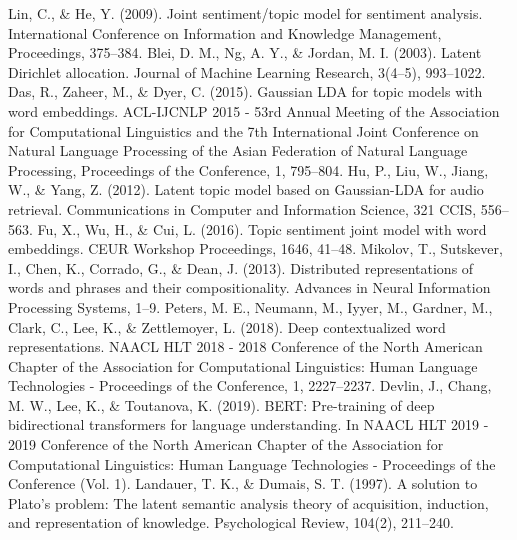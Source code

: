\documentclass[uplatex]{jsarticle}
\begin{document}
\begin{thebibliography}{数字}
     Lin, C., \& He, Y. (2009). Joint sentiment/topic model for sentiment analysis. International Conference on Information and Knowledge Management, Proceedings, 375–384.
     Blei, D. M., Ng, A. Y., \& Jordan, M. I. (2003). Latent Dirichlet allocation. Journal of Machine Learning Research, 3(4–5), 993–1022.
     Das, R., Zaheer, M., \& Dyer, C. (2015). Gaussian LDA for topic models with word embeddings. ACL-IJCNLP 2015 - 53rd Annual Meeting of the Association for Computational Linguistics and the 7th International Joint Conference on Natural Language Processing of the Asian Federation of Natural Language Processing, Proceedings of the Conference, 1, 795–804.
     Hu, P., Liu, W., Jiang, W., \& Yang, Z. (2012). Latent topic model based on Gaussian-LDA for audio retrieval. Communications in Computer and Information Science, 321 CCIS, 556–563.
     Fu, X., Wu, H., \& Cui, L. (2016). Topic sentiment joint model with word embeddings. CEUR Workshop Proceedings, 1646, 41–48.
     Mikolov, T., Sutskever, I., Chen, K., Corrado, G., \& Dean, J. (2013). Distributed representations of words and phrases and their compositionality. Advances in Neural Information Processing Systems, 1–9.
     Peters, M. E., Neumann, M., Iyyer, M., Gardner, M., Clark, C., Lee, K., \& Zettlemoyer, L. (2018). Deep contextualized word representations. NAACL HLT 2018 - 2018 Conference of the North American Chapter of the Association for Computational Linguistics: Human Language Technologies - Proceedings of the Conference, 1, 2227–2237.
     Devlin, J., Chang, M. W., Lee, K., \& Toutanova, K. (2019). BERT: Pre-training of deep bidirectional transformers for language understanding. In NAACL HLT 2019 - 2019 Conference of the North American Chapter of the Association for Computational Linguistics: Human Language Technologies - Proceedings of the Conference (Vol. 1).
     Landauer, T. K., \& Dumais, S. T. (1997). A solution to Plato's problem: The latent semantic analysis theory of acquisition, induction, and representation of knowledge. Psychological Review, 104(2), 211–240.

\end{thebibliography}
\end{document}
